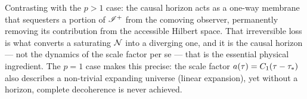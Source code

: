 Contrasting with the $p > 1$ case: the causal horizon acts as a one-way membrane
that sequesters a portion of $\mathscr{I}^{+}$ from the comoving observer, permanently
removing its contribution from the accessible Hilbert space.  That irreversible
loss is what converts a saturating $\mathcal{N}$ into a diverging one, and it is the
causal horizon — not the dynamics of the scale factor per se — that is the
essential physical ingredient.  The $p = 1$ case makes this precise: the scale
factor $a(\tau) = C_{1}(\tau - \tau_{*})$ also describes a non-trivial
expanding universe (linear expansion), yet without a horizon, complete decoherence
is never achieved.

